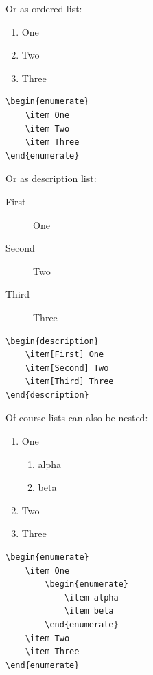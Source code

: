 Or as ordered list:
\begin{enumerate}
    \item One
    \item Two
    \item Three
\end{enumerate}
\begin{verbatim}
\begin{enumerate}
    \item One
    \item Two
    \item Three
\end{enumerate}
\end{verbatim}


Or as description list:
\begin{description}
    \item[First] One
    \item[Second] Two
    \item[Third] Three
\end{description}
\begin{verbatim}
\begin{description}
    \item[First] One
    \item[Second] Two
    \item[Third] Three
\end{description}
\end{verbatim}

Of course lists can also be nested:
\begin{enumerate}
    \item One
        \begin{enumerate}
            \item alpha
            \item beta
        \end{enumerate}
    \item Two
    \item Three
\end{enumerate}
\begin{verbatim}
\begin{enumerate}
    \item One
        \begin{enumerate}
            \item alpha
            \item beta
        \end{enumerate}
    \item Two
    \item Three
\end{enumerate}
\end{verbatim}


